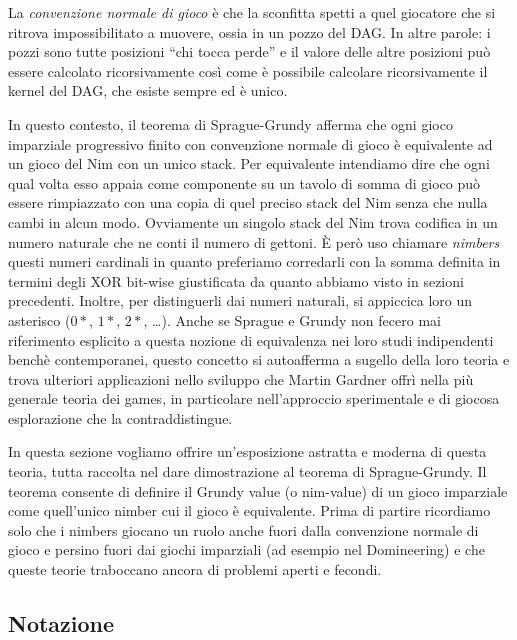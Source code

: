 \documentclass[a4paper, 10pt]{report}
\theoremstyle{definition} %
\begin{document}
La \emph{convenzione normale di gioco} è che la sconfitta spetti a quel giocatore
che si ritrova impossibilitato a muovere, ossia in un pozzo del DAG.
In altre parole: i pozzi sono tutte posizioni ``chi tocca perde''
e il valore delle altre posizioni può essere calcolato ricorsivamente così come
è possibile calcolare ricorsivamente il kernel del DAG, che esiste sempre ed è unico.

In questo contesto, il teorema di Sprague-Grundy
afferma che ogni gioco imparziale progressivo finito
con convenzione normale di gioco è equivalente ad un gioco del Nim con un unico stack.
Per equivalente intendiamo dire che ogni qual volta esso appaia come componente su un tavolo di somma di gioco può essere rimpiazzato con una copia di quel preciso stack del Nim senza che nulla cambi in alcun modo.
Ovviamente un singolo stack del Nim trova codifica in un numero naturale che ne conti il numero di gettoni. \`E però uso chiamare \emph{nimbers} questi numeri cardinali
in quanto preferiamo corredarli con la somma definita in termini degli XOR bit-wise
giustificata da quanto abbiamo visto in sezioni precedenti.
Inoltre, per distinguerli dai numeri naturali, si appiccica loro un asterisco ($0*$, $1*$, $2*$, \ldots).
Anche se Sprague e Grundy non fecero mai riferimento esplicito a questa nozione di equivalenza
nei loro studi indipendenti benchè contemporanei, questo concetto si autoafferma a sugello della loro teoria e trova ulteriori applicazioni nello sviluppo che Martin Gardner offrì nella più generale teoria dei games, in particolare nell'approccio sperimentale e di giocosa esplorazione che la contraddistingue.

In questa sezione vogliamo offrire un'esposizione astratta e moderna di questa teoria, tutta raccolta nel dare dimostrazione al teorema di Sprague-Grundy.
Il teorema consente di definire il Grundy value (o nim-value)
di un gioco imparziale come quell'unico nimber cui il gioco è equivalente.
Prima di partire ricordiamo solo che i nimbers giocano un ruolo anche fuori dalla convenzione normale di gioco e persino fuori dai giochi imparziali (ad esempio nel Domineering) e che queste teorie traboccano ancora di problemi aperti e fecondi. 

\subsection{Notazione}
\end{document}
